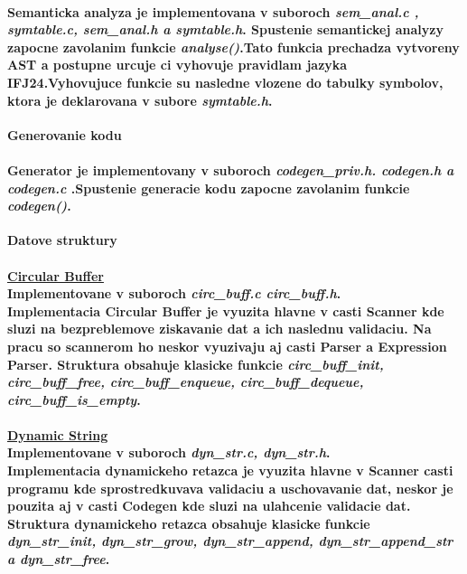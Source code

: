 \documentclass[12pt]{article}
\begin{document}
\paragraph{Semanticka analyza je implementovana v suboroch \textit{sem\_anal.c , symtable.c, sem\_anal.h a symtable.h}. Spustenie semantickej analyzy zapocne zavolanim funkcie \textit{analyse()}.Tato funkcia prechadza vytvoreny AST a postupne urcuje ci vyhovuje pravidlam jazyka IFJ24.Vyhovujuce funkcie su nasledne vlozene do tabulky symbolov, ktora je deklarovana v subore \textit{symtable.h}. \newline \\}

 \Large \textbf{Generovanie kodu} \normalsize \\
\noindent\makebox[\linewidth]{\rule{\textwidth}{0.4pt}}

\paragraph{Generator je implementovany v suboroch \textit{codegen\_priv.h. codegen.h a codegen.c }.Spustenie generacie kodu zapocne zavolanim funkcie \textit{codegen()}. \newline \\}

 \Large \textbf{Datove struktury}\normalsize \\
\noindent\makebox[\linewidth]{\rule{\textwidth}{0.4pt}}

\paragraph{\large \underline{Circular Buffer} \\ Implementovane v suboroch \textit{circ\_buff.c circ\_buff.h}. \\ \newline
Implementacia Circular Buffer je vyuzita hlavne v casti Scanner kde sluzi na bezpreblemove ziskavanie dat a ich naslednu validaciu. Na pracu so scannerom ho neskor vyuzivaju aj casti Parser a Expression Parser. Struktura obsahuje klasicke funkcie \textit{circ\_buff\_init, circ\_buff\_free, circ\_buff\_enqueue, circ\_buff\_dequeue, circ\_buff\_is\_empty}. 
\newline \\}

\paragraph{\large \underline{Dynamic String} \\ Implementovane v suboroch \textit{dyn\_str.c, dyn\_str.h}. \\ \newline
Implementacia dynamickeho retazca je vyuzita hlavne v Scanner casti programu kde sprostredkuvava validaciu a uschovavanie dat, neskor je pouzita aj v casti Codegen kde sluzi na ulahcenie validacie dat. Struktura dynamickeho retazca obsahuje klasicke funkcie \textit{dyn\_str\_init, dyn\_str\_grow, dyn\_str\_append, dyn\_str\_append\_str a dyn\_str\_free}.  
\newline \\}
\end{document}
